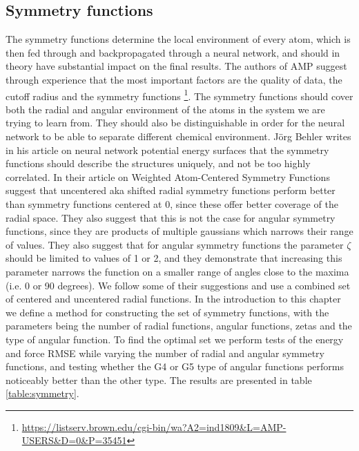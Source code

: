 \subsection{Symmetry functions}
The symmetry functions determine the local environment of every atom,
which is then fed through and backpropagated through a neural network,
and should in theory have substantial impact on the final results.
The authors of AMP suggest through experience that the most important
factors are the quality of data, the cutoff radius and the symmetry functions
\footnote{\url{
https://listserv.brown.edu/cgi-bin/wa?A2=ind1809&L=AMP-USERS&D=0&P=35451}}.
The symmetry functions should cover both the radial and angular
environment of the atoms in the system we are trying to learn from.
They should also be distinguishable in order for the neural network
to be able to separate different chemical environment.
J{\"o}rg Behler writes in his article on neural network potential
energy surfaces \parencite[Behler]{behler2011neural}
that the symmetry functions should describe the structures uniquely,
and not be too highly correlated.
In their article on Weighted Atom-Centered Symmetry Functions
\parencite[Gastegger et al.]{gastegger2018wacsf} suggest that uncentered
aka shifted radial symmetry functions perform better than symmetry functions
centered at 0, since these offer better coverage of the radial space.
They also suggest that this is not the case for angular symmetry functions,
since they are products of multiple gaussians which narrows their range
of values. They also suggest that for angular symmetry functions
the parameter $\zeta$ should be limited to values of 1 or 2,
and they demonstrate that increasing this parameter narrows
the function on a smaller range of angles close to the maxima
(i.e. 0 or 90 degrees).
We follow some of their suggestions and use a combined set of
centered and uncentered radial functions. 
In the introduction to this chapter we define a method
for constructing the set of symmetry functions, with the parameters
being the number of radial functions, angular functions, zetas
and the type of angular function.
To find the optimal set
we perform tests of the energy and force RMSE while varying the
number of radial and angular symmetry functions, and testing
whether the G4 or G5 type of angular functions performs noticeably
better than the other type.
The results are presented in table \ref{table:symmetry}.

